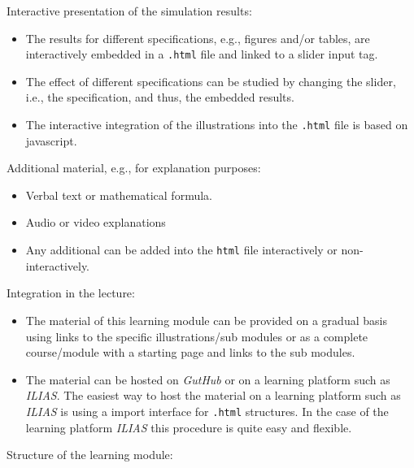 \documentclass{article}
\begin{document}
Interactive presentation of the simulation results:

\begin{itemize}
	\item The results for different specifications, e.g., figures and/or tables, are interactively embedded in a \texttt{.html} file and linked to a slider input tag.
	\item The effect of different specifications can be studied by changing the slider, i.e., the specification, and thus, the embedded results.
	\item The interactive integration of the illustrations into the \texttt{.html} file is based on javascript.
\end{itemize}

Additional material, e.g., for explanation purposes:

\begin{itemize}
	\item Verbal text or mathematical formula.
	\item Audio or video explanations
	\item Any additional can be added into the \texttt{html} file interactively or non-interactively.
\end{itemize}

Integration in the lecture:

\begin{itemize}
	\item The material of this learning module can be provided on a gradual basis using links to the specific illustrations/sub modules or as a complete course/module with a starting page and links to the sub modules.
	\item The material can be hosted on \emph{GutHub} or on a learning platform such as \emph{ILIAS}. The easiest way to host the material on a learning platform such as \emph{ILIAS} is using a import interface for \texttt{.html} structures. In the case of the learning platform \emph{ILIAS} this procedure is quite easy and flexible.	
\end{itemize}

Structure of the learning module:
\end{document}
